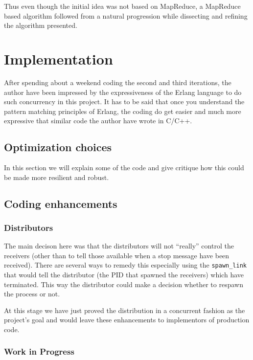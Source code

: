 \documentclass[a4paper,11pt]{report}
\begin{document}
Thus even though the initial idea was not based on MapReduce, a
MapReduce based algorithm followed from a natural progression while
dissecting and refining the algorithm presented.

\chapter{Implementation}

After spending about a weekend coding the second and third iterations,
the author have been impressed by the expressiveness of the Erlang
language to do such concurrency in this project. It has to be said
that once you understand the pattern matching principles of Erlang,
the coding do get easier and much more expressive that similar code
the author have wrote in C/C++.


\pagebreak

\section{Optimization choices}

In this section we will explain some of the code and give critique how
this could be made more resilient and robust.

\section{Coding enhancements}
\subsection{Distributors}
\label{sec:codedist}

The main decison here was that the distributors will not ``really''
control the receivers (other than to tell those available when a stop
message have been received). There are several ways to remedy this
especially using the \texttt{spawn\_link} that would tell the
distributor (the PID that spawned the receivers) which have
terminated. This way the distributor could make a decision whether to
respawn the process or not. 

At this stage we have just proved the distribution in a concurrent
fashion as the project's goal and would leave these enhancements to
implementors of production code.

\subsection{Work in Progress}
\end{document}
